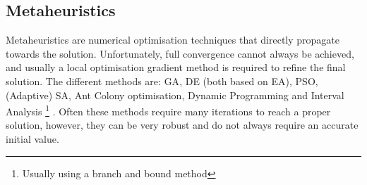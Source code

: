 \subsection{Metaheuristics}
\label{subsec:meta}
Metaheuristics are numerical optimisation techniques that directly propagate towards the solution. Unfortunately, full convergence cannot always be achieved, and usually a local optimisation gradient method is required to refine the final solution. The different methods are: \ac{GA}, \ac{DE} (both based on \ac{EA}), \ac{PSO}, (Adaptive) \ac{SA}, Ant Colony optimisation, Dynamic Programming and Interval Analysis \footnote{Usually using a branch and bound method} \cite{noomen2013,musegaas2012}. Often these methods require many iterations to reach a proper solution, however, they can be very robust and do not always require an accurate initial value.







